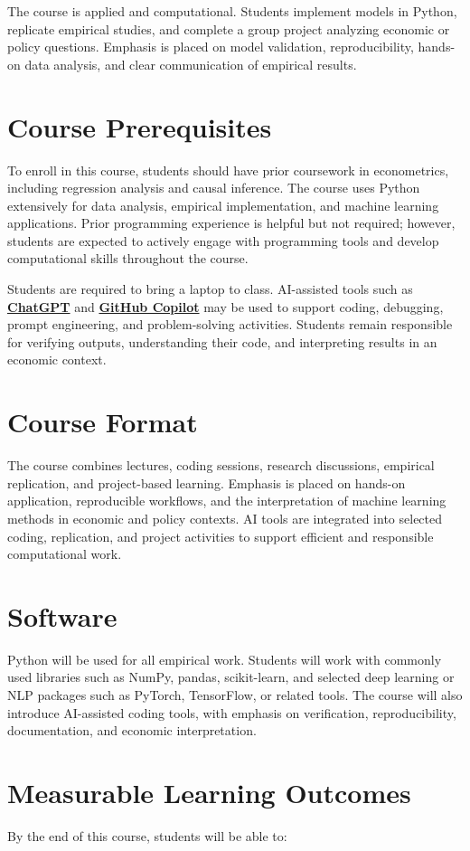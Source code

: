 \documentclass[11pt]{article}
\newcommand{\coloredsection}[1]{%
    \section*{\large\textcolor{sectioncolor}{#1}}%
}
\begin{document}
The course is applied and computational. Students implement models in Python, replicate empirical studies, and complete a group project analyzing economic or policy questions. Emphasis is placed on model validation, reproducibility, hands-on data analysis, and clear communication of empirical results.



\coloredsection{Course Prerequisites}

To enroll in this course, students should have prior coursework in econometrics, including regression analysis and causal inference. The course uses Python extensively for data analysis, empirical implementation, and machine learning applications. Prior programming experience is helpful but not required; however, students are expected to actively engage with programming tools and develop computational skills throughout the course.

Students are required to bring a laptop to class. AI-assisted tools such as \textbf{\href{https://openai.com/chatgpt}{ChatGPT}} and \textbf{\href{https://github.com/features/copilot}{GitHub Copilot}} may be used to support coding, debugging, prompt engineering, and problem-solving activities. Students remain responsible for verifying outputs, understanding their code, and interpreting results in an economic context.


\coloredsection{Course Format}

The course combines lectures, coding sessions, research discussions, empirical replication, and project-based learning. Emphasis is placed on hands-on application, reproducible workflows, and the interpretation of machine learning methods in economic and policy contexts. AI tools are integrated into selected coding, replication, and project activities to support efficient and responsible computational work.

\coloredsection{Software}

Python will be used for all empirical work. Students will work with commonly used libraries such as NumPy, pandas, scikit-learn, and selected deep learning or NLP packages such as PyTorch, TensorFlow, or related tools. The course will also introduce AI-assisted coding tools, with emphasis on verification, reproducibility, documentation, and economic interpretation.


\coloredsection{Measurable Learning Outcomes}

By the end of this course, students will be able to:
\end{document}
